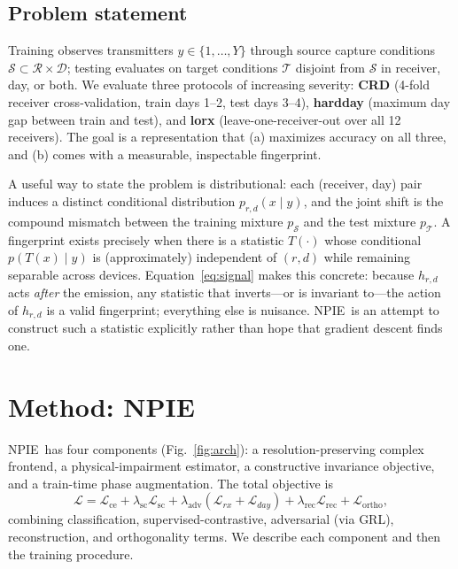 \documentclass[journal]{IEEEtran}
\newcommand{\npie}{\textsc{NPIE}}
\begin{document}
\subsection{Problem statement}
Training observes transmitters $y\in\{1,\dots,Y\}$ through source capture conditions $\mathcal{S}\subset\mathcal{R}\times\mathcal{D}$; testing evaluates on target conditions $\mathcal{T}$ disjoint from $\mathcal{S}$ in receiver, day, or both. We evaluate three protocols of increasing severity: \textbf{CRD} (4-fold receiver cross-validation, train days 1--2, test days 3--4), \textbf{hardday} (maximum day gap between train and test), and \textbf{lorx} (leave-one-receiver-out over all 12 receivers). The goal is a representation that (a) maximizes accuracy on all three, and (b) comes with a measurable, inspectable fingerprint.

A useful way to state the problem is distributional: each (receiver, day) pair induces a distinct conditional distribution $p_{r,d}(x\mid y)$, and the joint shift is the compound mismatch between the training mixture $p_{\mathcal{S}}$ and the test mixture $p_{\mathcal{T}}$. A fingerprint exists precisely when there is a statistic $T(\cdot)$ whose conditional $p(T(x)\mid y)$ is (approximately) independent of $(r,d)$ while remaining separable across devices. Equation~\eqref{eq:signal} makes this concrete: because $h_{r,d}$ acts \emph{after} the emission, any statistic that inverts---or is invariant to---the action of $h_{r,d}$ is a valid fingerprint; everything else is nuisance. \npie\ is an attempt to construct such a statistic explicitly rather than hope that gradient descent finds one.

\section{Method: \npie}
\label{sec:method}
\npie\ has four components (Fig.~\ref{fig:arch}): a resolution-preserving complex frontend, a physical-impairment estimator, a constructive invariance objective, and a train-time phase augmentation. The total objective is
\begin{equation}
\mathcal{L} = \mathcal{L}_{\mathrm{ce}} + \lambda_{\mathrm{sc}}\mathcal{L}_{\mathrm{sc}} + \lambda_{\mathrm{adv}}(\mathcal{L}_{rx}+\mathcal{L}_{day}) + \lambda_{\mathrm{rec}}\mathcal{L}_{\mathrm{rec}} + \mathcal{L}_{\mathrm{ortho}},
\label{eq:total}
\end{equation}
combining classification, supervised-contrastive, adversarial (via GRL), reconstruction, and orthogonality terms. We describe each component and then the training procedure.
\end{document}
